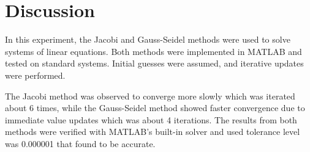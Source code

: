 \documentclass[a4paper,12pt]{article}
\begin{document}
	
	
	
	
\section{Discussion}
In this experiment, the Jacobi and Gauss-Seidel methods were used to solve systems of linear equations. Both methods were implemented in MATLAB and tested on standard systems. Initial guesses were assumed, and iterative updates were performed.

The Jacobi method was observed to converge more slowly which was iterated about 6 times, while the Gauss-Seidel method showed faster convergence due to immediate value updates which was about 4 iterations. The results from both methods were verified with MATLAB’s built-in solver and used tolerance level was 0.000001 that found to be accurate.



	
	
	
	
	
\end{document}
